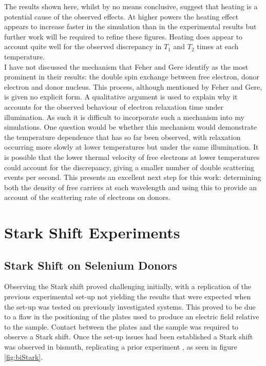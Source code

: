 The results shown here, whilst by no means conclusive, suggest that heating is a potential cause of the observed effects.
At higher powers the heating effect appears to increase faster in the simulation than in the experimental results but further work will be required to refine these figures.
Heating does appear to account quite well for the observed discrepancy in $T_1$ and $T_2$ times at each temperature.
\\
I have not discussed the mechanism that Feher and Gere identify as the most prominent in their results: the double spin exchange between free electron, donor electron and donor nucleus.
This process, although mentioned by Feher and Gere, is given no explicit form.
A qualitative argument is used to explain why it accounts for the observed behaviour of electron relaxation time under illumination.
As such it is difficult to incorporate such a mechanism into my simulations.
One question would be whether this mechanism would demonstrate the temperature dependence that has so far been observed, with relaxation occurring more slowly at lower temperatures but under the same illumination.
It is possible that the lower thermal velocity of free electrons at lower temperatures could account for the discrepancy, giving a smaller number of double scattering events per second.
This presents an excellent next step for this work: determining both the density of free carriers at each wavelength and using this to provide an account of the scattering rate of electrons on donors.

\section{Stark Shift Experiments}

\subsection{Stark Shift on Selenium Donors}

Observing the Stark shift proved challenging initially, with a replication of the previous experimental set-up not yielding the results that were expected when the set-up was tested on previously investigated systems.
This proved to be due to a flaw in the positioning of the plates used to produce an electric field relative to the sample.
Contact between the plates and the sample was required to observe a Stark shift.
Once the set-up issues had been established a Stark shift was observed in bismuth, replicating a prior experiment \cite{Wolfowicz2014}, as seen in figure \ref{fig:biStark}.


